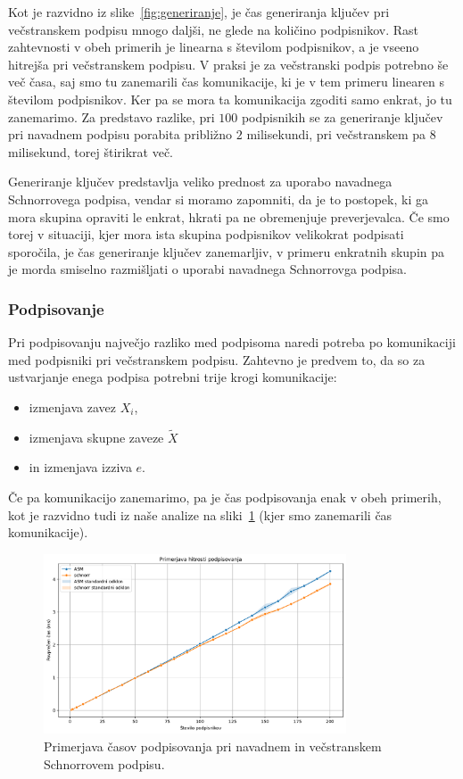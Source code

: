 \documentclass[isrm2, tisk]{fmfdelo}
\begin{document}
Kot je razvidno iz slike~\ref{fig:generiranje}, je čas generiranja ključev pri večstranskem podpisu
mnogo daljši, ne glede na količino podpisnikov. Rast zahtevnosti v obeh primerih je linearna
s številom podpisnikov, a je vseeno hitrejša pri večstranskem podpisu. V praksi je za večstranski
podpis potrebno še več časa, saj smo tu zanemarili čas komunikacije, ki je v tem primeru linearen
s številom podpisnikov. Ker pa se mora ta komunikacija zgoditi samo enkrat, jo tu zanemarimo. Za
predstavo razlike, pri $100$ podpisnikih se za generiranje ključev pri navadnem podpisu porabita
približno $2$ milisekundi, pri večstranskem pa $8$ milisekund, torej štirikrat več.

Generiranje ključev predstavlja veliko prednost za uporabo navadnega Schnorrovega podpisa, vendar
si moramo zapomniti, da je to postopek, ki ga mora skupina opraviti le enkrat, hkrati pa ne obremenjuje
preverjevalca. Če smo torej v situaciji, kjer mora ista skupina podpisnikov velikokrat podpisati
sporočila, je čas generiranje ključev zanemarljiv, v primeru enkratnih skupin pa je morda smiselno
razmišljati o uporabi navadnega Schnorrovga podpisa.

\subsubsection{Podpisovanje}
Pri podpisovanju največjo razliko med podpisoma naredi potreba po komunikaciji med podpisniki pri
večstranskem podpisu. Zahtevno je predvem to, da so za ustvarjanje enega podpisa potrebni trije
krogi komunikacije: 
\begin{itemize}
    \item izmenjava zavez $X_i$,
    \item izmenjava skupne zaveze $\tilde{X}$
    \item in izmenjava izziva $e$.
\end{itemize}
Če pa komunikacijo zanemarimo, pa je čas podpisovanja enak v obeh primerih, kot je razvidno tudi
iz naše analize na sliki~\ref{fig:podpisovanje} (kjer smo zanemarili čas komunikacije).


\begin{figure}[ht]
  \centering
  \includegraphics[width=0.8\textwidth]{images/benchmark_Signing.pdf}
  \caption[Podpisovanje.]{Primerjava časov podpisovanja pri navadnem in večstranskem
    Schnorrovem podpisu.}
  \label{fig:podpisovanje}
\end{figure}
\end{document}
